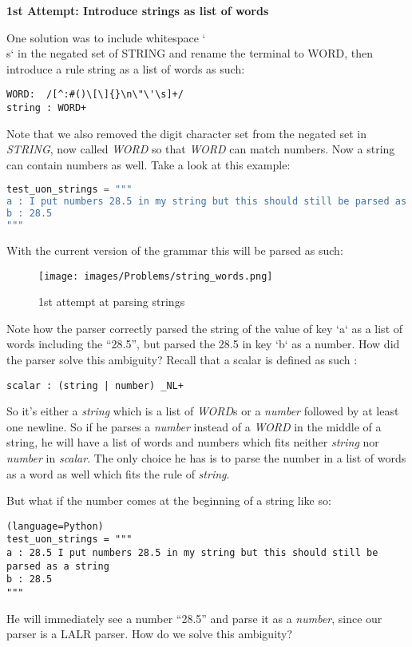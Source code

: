 \documentclass[12pt]{article}
\begin{document}
\textbf{1st Attempt: Introduce strings as list of words}

One solution was to include whitespace `\\s` in the negated set of STRING and rename the terminal to WORD, then introduce a rule string as a list of words as such:
\begin{lstlisting}
WORD:  /[^:#()\[\]{}\n\"\'\s]+/
string : WORD+
\end{lstlisting}
Note that we also removed the digit character set from the negated set in \emph{STRING}, now called \emph{WORD} so that \emph{WORD} can match numbers. Now a string can contain numbers as well. Take a look at this example:

\begin{lstlisting}[language=Python]
test_uon_strings = """
a : I put numbers 28.5 in my string but this should still be parsed as a string
b : 28.5
"""
\end{lstlisting}

With the current version of the grammar this will be parsed as such:
\begin{figure}[h!]
 	\centering
 	\caption{1st attempt at parsing strings}
 	\texttt{[image: images/Problems/string\_words.png]}
 	\label{lab:perceptron}
\end{figure}

Note how the parser correctly parsed the string of the value of key `a` as a list of words including the “28.5”, but parsed the 28.5 in key `b` as a number. How did the parser solve this ambiguity? Recall that a scalar is defined as such :
\begin{lstlisting}
scalar : (string | number) _NL+
\end{lstlisting}
So it’s either a \emph{string} which is a list of \emph{WORD}s or a \emph{number} followed by at least one newline. So if he parses a \emph{number} instead of a \emph{WORD} in the middle of a string, he will have a list of words and numbers which fits neither \emph{string} nor \emph{number} in \emph{scalar}. The only choice he has is to parse the number in a list of words as a word as well which fits the rule of \emph{string}. 

But what if the number comes at the beginning of a string like so:
\begin{lstlisting}(language=Python)
test_uon_strings = """
a : 28.5 I put numbers 28.5 in my string but this should still be parsed as a string
b : 28.5
"""
\end{lstlisting}
He will immediately see a number “28.5” and parse it as a \emph{number}, since our parser is a LALR parser. How do we solve this ambiguity?
\end{document}
